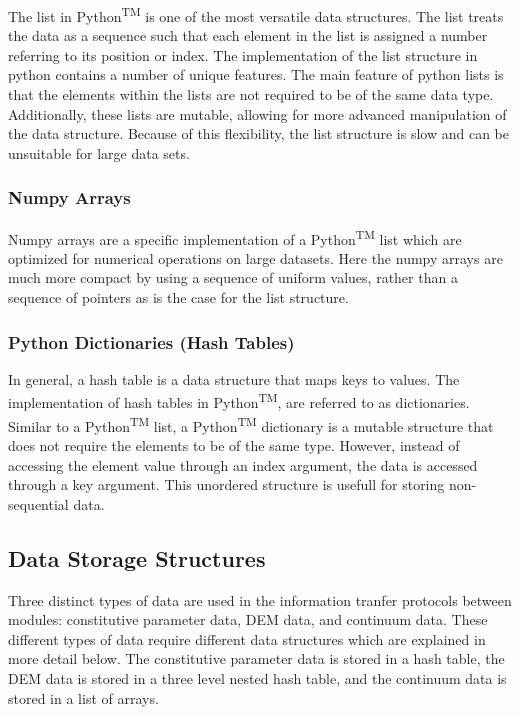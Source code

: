 The list in Python\textsuperscript{TM} is one of the most versatile data structures. The list treats the data as a sequence such that each element in the list is assigned a number referring to its position or index.  The implementation of the list structure in python contains a number of unique features. The main feature of python lists is that the elements within the lists are not required to be of the same data type. Additionally, these lists are mutable, allowing for more advanced manipulation of the data structure. Because of this flexibility, the list structure is slow and can be unsuitable for large data sets. 

\subsubsection*{Numpy Arrays}

Numpy arrays are a specific implementation of a Python\textsuperscript{TM} list which are optimized for numerical operations on large datasets. Here the numpy arrays are much more compact by using a sequence of uniform values, rather than a sequence of pointers as is the case for the list structure.

\subsubsection*{Python Dictionaries (Hash Tables)}

In general, a hash table is a data structure that maps keys to values. The implementation of hash tables in Python\textsuperscript{TM}, are referred to as dictionaries. Similar to a Python\textsuperscript{TM} list, a Python\textsuperscript{TM} dictionary is a mutable structure that does not require the elements to be of the same type. However, instead of accessing the element value through an index argument, the data is accessed through a key argument. This unordered structure is usefull for storing non-sequential data.

\subsection{Data Storage Structures}

Three distinct types of data are used in the information tranfer protocols between modules: constitutive parameter data, DEM data, and continuum data. These different types of data require different data structures which are explained in more detail below. The constitutive parameter data is stored in a hash table, the DEM data is stored in a three level nested hash table, and the continuum data is stored in a list of arrays.

